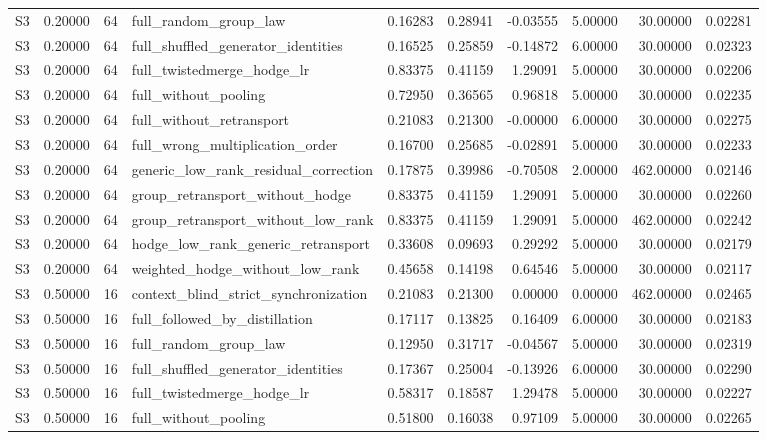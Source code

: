 \begin{tabular}{lrrlrrrrrr}
S3 & 0.20000 & 64 & full_random_group_law & 0.16283 & 0.28941 & -0.03555 & 5.00000 & 30.00000 & 0.02281 \\
S3 & 0.20000 & 64 & full_shuffled_generator_identities & 0.16525 & 0.25859 & -0.14872 & 6.00000 & 30.00000 & 0.02323 \\
S3 & 0.20000 & 64 & full_twistedmerge_hodge_lr & 0.83375 & 0.41159 & 1.29091 & 5.00000 & 30.00000 & 0.02206 \\
S3 & 0.20000 & 64 & full_without_pooling & 0.72950 & 0.36565 & 0.96818 & 5.00000 & 30.00000 & 0.02235 \\
S3 & 0.20000 & 64 & full_without_retransport & 0.21083 & 0.21300 & -0.00000 & 6.00000 & 30.00000 & 0.02275 \\
S3 & 0.20000 & 64 & full_wrong_multiplication_order & 0.16700 & 0.25685 & -0.02891 & 5.00000 & 30.00000 & 0.02233 \\
S3 & 0.20000 & 64 & generic_low_rank_residual_correction & 0.17875 & 0.39986 & -0.70508 & 2.00000 & 462.00000 & 0.02146 \\
S3 & 0.20000 & 64 & group_retransport_without_hodge & 0.83375 & 0.41159 & 1.29091 & 5.00000 & 30.00000 & 0.02260 \\
S3 & 0.20000 & 64 & group_retransport_without_low_rank & 0.83375 & 0.41159 & 1.29091 & 5.00000 & 462.00000 & 0.02242 \\
S3 & 0.20000 & 64 & hodge_low_rank_generic_retransport & 0.33608 & 0.09693 & 0.29292 & 5.00000 & 30.00000 & 0.02179 \\
S3 & 0.20000 & 64 & weighted_hodge_without_low_rank & 0.45658 & 0.14198 & 0.64546 & 5.00000 & 30.00000 & 0.02117 \\
S3 & 0.50000 & 16 & context_blind_strict_synchronization & 0.21083 & 0.21300 & 0.00000 & 0.00000 & 462.00000 & 0.02465 \\
S3 & 0.50000 & 16 & full_followed_by_distillation & 0.17117 & 0.13825 & 0.16409 & 6.00000 & 30.00000 & 0.02183 \\
S3 & 0.50000 & 16 & full_random_group_law & 0.12950 & 0.31717 & -0.04567 & 5.00000 & 30.00000 & 0.02319 \\
S3 & 0.50000 & 16 & full_shuffled_generator_identities & 0.17367 & 0.25004 & -0.13926 & 6.00000 & 30.00000 & 0.02290 \\
S3 & 0.50000 & 16 & full_twistedmerge_hodge_lr & 0.58317 & 0.18587 & 1.29478 & 5.00000 & 30.00000 & 0.02227 \\
S3 & 0.50000 & 16 & full_without_pooling & 0.51800 & 0.16038 & 0.97109 & 5.00000 & 30.00000 & 0.02265 \\

\end{tabular}
